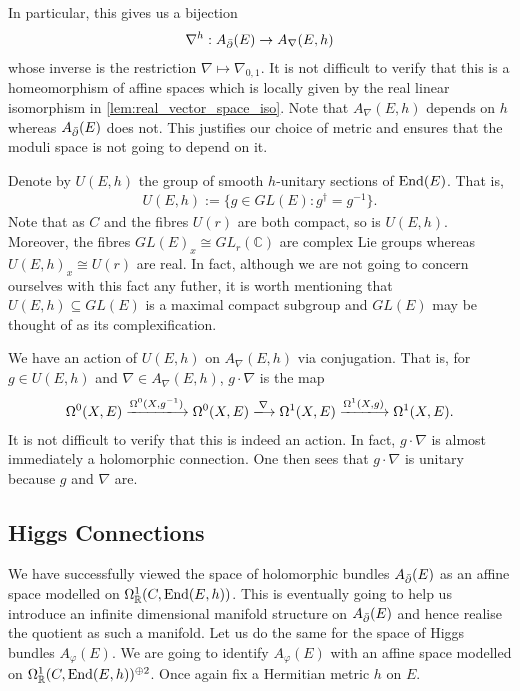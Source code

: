 \documentclass[12pt]{ociamthesis}  %
\begin{document}
In particular, this gives us a bijection
\begin{align}\label{eq:chern_correspondence}
  \nabla^h : A_{\bar{\partial}} (E) \to A_\nabla(E,h)
\end{align}
whose inverse is the restriction
$\nabla \mapsto \nabla_{0,1}$. It is not difficult to verify that this
is a homeomorphism of affine spaces which is locally given by
the real linear isomorphism in \ref{lem:real_vector_space_iso}.
Note that $A_\nabla(E,h)$ depends on $h$ whereas $A_{{\bar{\partial}}}(E)$ does
not. This justifies our choice of metric and ensures that the
moduli space is not going to depend on it.

Denote by $U(E,h)$ the group of smooth $h$-unitary sections of $\operatorname{End}(E)$.
That is,
\begin{align*}
  U(E,h) := \{g \in GL(E) : g^\dagger = g^{-1}\}.
\end{align*}
Note that as $C$ and the fibres $U(r)$ are both compact,
so is $U(E,h)$. Moreover, the fibres $GL(E)_x \cong GL_r(\mathbb C)$
are complex Lie groups whereas $U(E,h)_x\cong U(r)$ are real.
In fact, although we are not going to concern ourselves with this
fact any futher, it is worth mentioning that $U(E,h)\subseteq GL(E)$
is a maximal compact subgroup and $GL(E)$ may be thought of as its
complexification.

We have an action of $U(E,h)$ on $A_\nabla(E,h)$ via conjugation. That is,
for $g\in U(E,h)$ and $\nabla\in A_\nabla(E,h)$, $g\cdot\nabla$ is the map
\begin{align*}
  \Omega^0(X,E) \xlongrightarrow{\Omega^0(X,{g}^{-1})}
  \Omega^0(X,E) \xlongrightarrow{\nabla}
  \Omega^1(X,E) \xlongrightarrow{\Omega^1(X,g)}
  \Omega^1(X,E).
\end{align*}
It is not difficult to verify that this is indeed an action.
In fact, $g\cdot\nabla$ is almost immediately a holomorphic connection.
One then sees that $g\cdot\nabla$ is unitary because
$g$ and $\nabla$ are.

\subsection{Higgs Connections}

We have successfully viewed the space of holomorphic bundles
$A_{\bar{\partial}} (E)$ as an affine space modelled on
$\Omega^1_{\mathbb{R}}(C,\operatorname{End}(E,h))$. This is eventually going
to help us introduce an infinite dimensional manifold structure on
$A_{\bar{\partial}} (E)$ and hence realise the quotient as such a manifold.
Let us do the same for the space of Higgs
bundles $A_\varphi(E)$. We are going to identify $A_\varphi(E)$ with an affine
space modelled on $\Omega^1_{\mathbb{R}}(C,\operatorname{End}(E,h))^{\oplus 2}$.
Once again fix a Hermitian metric $h$ on $E$.
\end{document}
